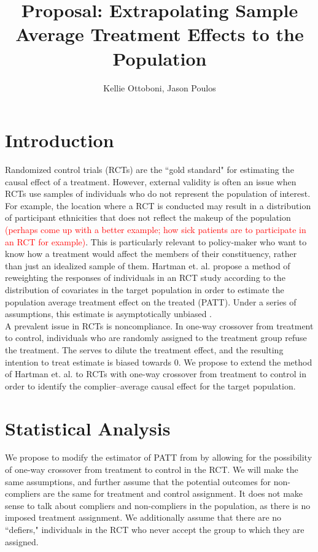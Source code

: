 \documentclass{article}
\title{Proposal: Extrapolating Sample Average Treatment Effects to the Population}
\author{Kellie Ottoboni, Jason Poulos}
\begin{document}
\maketitle

\section{Introduction}
Randomized control trials (RCTs) are the ``gold standard" for estimating the causal effect of a treatment.  However, external validity is often an issue when RCTs use samples of individuals who do not represent the population of interest.  For example, the location where a RCT is conducted may result in a distribution of participant ethnicities that does not reflect the makeup of the population \textcolor{red}{(perhaps come up with a better example; how sick patients are to participate in an RCT for example)}.  This is particularly relevant to policy-maker who want to know how a treatment would affect the members of their constituency, rather than just an idealized sample of them.  Hartman et. al. propose a method of reweighting the responses of individuals in an RCT study according to the distribution of covariates in the target population in order to estimate the population average treatment effect on the treated (PATT).  Under a series of assumptions, this estimate is asymptotically unbiased \cite{Hartman}. \\

A prevalent issue in RCTs is noncompliance.  In one-way crossover from treatment to control, individuals who are randomly assigned to the treatment group refuse the treatment.  The serves to dilute the treatment effect, and the resulting intention to treat estimate is biased towards $0$.  We propose to extend the method of Hartman et. al. to RCTs with one-way crossover from treatment to control in order to identify the complier--average causal effect for the target population.

\section{Statistical Analysis}
We propose to modify the estimator of PATT from \cite{Hartman} by allowing for the possibility of one-way crossover from treatment to control in the RCT.  We will make the same assumptions, and further assume that the potential outcomes for non-compliers are the same for treatment and control assignment.  It does not make sense to talk about compliers and non-compliers in the population, as there is no imposed treatment assignment.  We additionally assume that there are no ``defiers," individuals in the RCT who never accept the group to which they are assigned. \\
\end{document}
